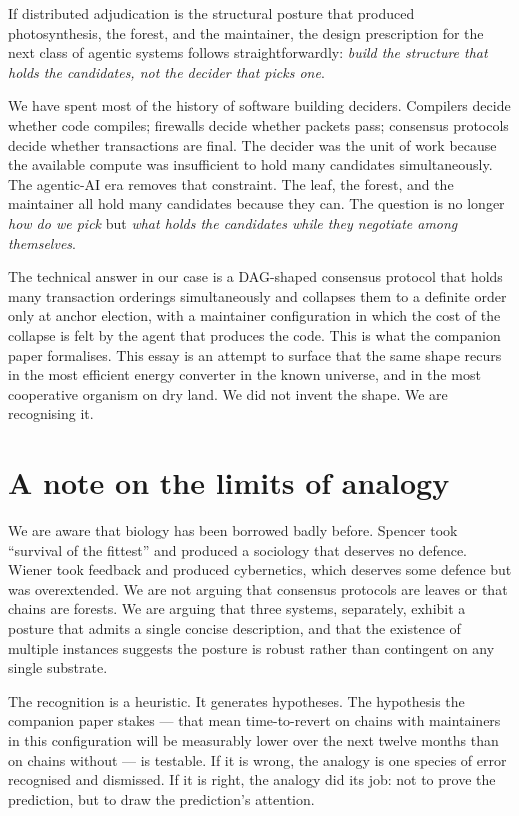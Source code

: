 \documentclass[11pt,a4paper]{article}
\begin{document}
If distributed adjudication is the structural posture that produced
photosynthesis, the forest, and the maintainer, the design
prescription for the next class of agentic systems follows
straightforwardly: \emph{build the structure that holds the
candidates, not the decider that picks one}.

We have spent most of the history of software building deciders.
Compilers decide whether code compiles; firewalls decide whether
packets pass; consensus protocols decide whether transactions are
final. The decider was the unit of work because the available
compute was insufficient to hold many candidates simultaneously. The
agentic-AI era removes that constraint. The leaf, the forest, and
the maintainer all hold many candidates because they can. The
question is no longer \emph{how do we pick} but \emph{what holds the
candidates while they negotiate among themselves}.

The technical answer in our case is a DAG-shaped consensus protocol
that holds many transaction orderings simultaneously and collapses
them to a definite order only at anchor election, with a maintainer
configuration in which the cost of the collapse is felt by the
agent that produces the code. This is what the companion paper
formalises. This essay is an attempt to surface that the same shape
recurs in the most efficient energy converter in the known universe,
and in the most cooperative organism on dry land. We did not invent
the shape. We are recognising it.

\section{A note on the limits of analogy}

We are aware that biology has been borrowed badly before. Spencer
took ``survival of the fittest'' and produced a sociology that
deserves no defence. Wiener took feedback and produced cybernetics,
which deserves some defence but was overextended. We are not arguing
that consensus protocols are leaves or that chains are forests. We
are arguing that three systems, separately, exhibit a posture that
admits a single concise description, and that the existence of
multiple instances suggests the posture is robust rather than
contingent on any single substrate.

The recognition is a heuristic. It generates hypotheses. The
hypothesis the companion paper stakes --- that mean time-to-revert
on chains with maintainers in this configuration will be measurably
lower over the next twelve months than on chains without --- is
testable. If it is wrong, the analogy is one species of error
recognised and dismissed. If it is right, the analogy did its job:
not to prove the prediction, but to draw the prediction's attention.
\end{document}
